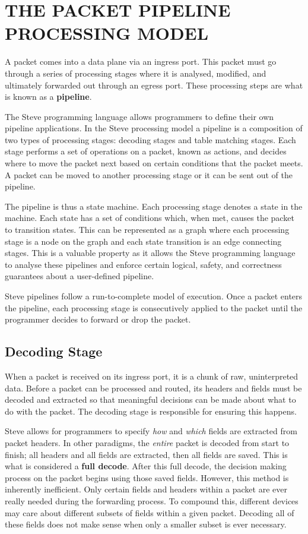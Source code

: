 \chapter{THE PACKET PIPELINE PROCESSING MODEL} \label{pipeline_model}

A packet comes into a data plane via an ingress port. This packet must go through a series of processing stages where it is analysed, modified, and ultimately forwarded out through an egress port. These processing steps are what is known as a \textbf{pipeline}.

The Steve programming language allows programmers to define their own pipeline applications. In the Steve processing model a pipeline is a composition of two types of processing stages: decoding stages and table matching stages. Each stage performs a set of operations on a packet, known as actions, and decides where to move the packet next based on certain conditions that the packet meets. A packet can be moved to another processing stage or it can be sent out of the pipeline.

The pipeline is thus a state machine. Each processing stage denotes a state in the machine. Each state has a set of conditions which, when met, causes the packet to transition states. This can be represented as a graph where each processing stage is a node on the graph and each state transition is an edge connecting stages. This is a valuable property as it allows the Steve programming language to analyse these pipelines and enforce certain logical, safety, and correctness guarantees about a user-defined pipeline.

Steve pipelines follow a run-to-complete model of execution. Once a packet enters the pipeline, each processing stage is consecutively applied to the packet until the programmer decides to forward or drop the packet.

\section{Decoding Stage} \label{decoder_desc}

When a packet is received on its ingress port, it is a chunk of raw, uninterpreted data. Before a packet can be processed and routed, its headers and fields must be decoded and extracted so that meaningful decisions can be made about what to do with the packet. The decoding stage is responsible for ensuring this happens.

Steve allows for programmers to specify \textit{how} and \textit{which} fields are extracted from packet headers. In other paradigms, the \textit{entire} packet is decoded from start to finish; all headers and all fields are extracted, then all fields are saved. This is what is considered a \textbf{full decode}. After this full decode, the decision making process on the packet begins using those saved fields. However, this method is inherently inefficient. Only certain fields and headers within a packet are ever really needed during the forwarding process. To compound this, different devices may care about different subsets of fields within a given packet. Decoding all of these fields does not make sense when only a smaller subset is ever necessary.

